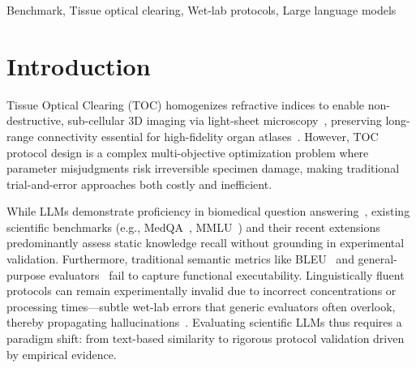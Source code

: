 \documentclass[conference]{IEEEtran}
\begin{document}
\begin{IEEEkeywords}
Benchmark, Tissue optical clearing, Wet-lab protocols, Large language models
\end{IEEEkeywords}

\section{Introduction}
Tissue Optical Clearing (TOC) homogenizes refractive indices to enable
non-destructive, sub-cellular 3D imaging via light-sheet
microscopy~\cite{ueda2020tissue,chung2013clarity}, preserving long-range
connectivity essential for high-fidelity organ
atlases~\cite{wang2025advances,richardson2025unlocking}. However, TOC protocol
design is a complex multi-objective optimization problem where parameter
misjudgments risk irreversible specimen damage, making traditional
trial-and-error approaches both costly and inefficient.

While LLMs demonstrate proficiency in biomedical question
answering~\cite{singhal2023medpalm}, existing scientific benchmarks (e.g.,
MedQA~\cite{jin2021disease}, MMLU~\cite{hendrycks2021mmlu}) and their recent
extensions~\cite{zhang2025benchmarking,wang2025cardbiomedbench,feng2024mediq}
predominantly assess static knowledge recall without grounding in experimental
validation. Furthermore, traditional semantic metrics like
BLEU~\cite{papineni2002bleu} and general-purpose
evaluators~\cite{liu2023geval,li2024survey} fail to capture functional
executability. Linguistically fluent protocols can remain experimentally
invalid due to incorrect concentrations or processing times---subtle wet-lab
errors that generic evaluators often overlook, thereby propagating
hallucinations~\cite{bang2025hallulens,zhang2025survey}. Evaluating scientific
LLMs thus requires a paradigm shift: from text-based similarity to rigorous
protocol validation driven by empirical evidence.
\end{document}
